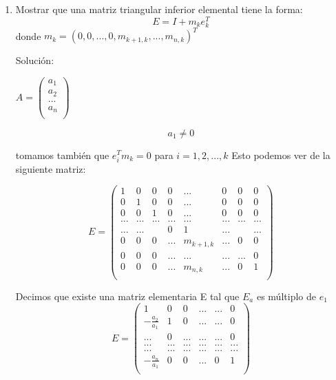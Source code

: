 \begin{enumerate}
    \item Mostrar que una matriz triangular inferior elemental tiene la forma:\\
    
        $$E = I + m_{k}e_{k}^{T}$$
        donde $m_{k}=(0,0,...,0,m_{k+1,k}, ..., m_{n,k})^{T} $
        
        Solución:
        
        \(
            A =
            \left( {\begin{array}{c}
                a_{1} \\
                a_{2} \\
                ... \\
                a_{n}\\
            \end{array} } \right)
        \)
        
        $$a_{1} \neq 0 $$
        
        tomamos también que $e_{i}^{T}m_{k} = 0$ para $i = 1, 2, ..., k$
        Esto podemos ver de la siguiente matriz:
        
        \[
        E =
            \left( {\begin{array}{cccccccc}
                1 & 0  & 0 & 0 & ... & 0 & 0 & 0\\
                0 & 1  & 0 & 0 & ... & 0 & 0 & 0\\
                0 & 0  & 1 & 0 & ... & 0 & 0 & 0\\
                ... & ... & ... & ... & ... & ... & ... & ...\\
                ... & ... &  & 0 & 1 & ... &  & ...\\
                0 & 0  & 0 & ... & m_{k+1,k} & ... & 0 & 0\\
                0 & 0  & 0 & ... & ... & ... & ... & 0\\
                0 & 0  & 0 & ... & m_{n,k} & ... & 0 & 1\\
            \end{array} } \right)
        \]
        
        
        Decimos que existe una matriz elementaria E tal que  $E_{a}$ es múltiplo de $e_{1}$
        \[
        E =
            \left( {\begin{array}{cccccc}
                1 & 0  & 0 & ... & ... & 0\\
                -\frac{a_{2}}{a_{1}} & 1  & 0 & ... & ... & 0\\
                ... & 0 & ... & ... & ... & 0 \\
                ... & ... & ... & ... & ... & ... \\
                ... & ... & ... & ... & ... & ... \\
                -\frac{a_{n}}{a_{1}} & 0 & 0 & ... & 0 & 1 \\
            \end{array} } \right)
        \]
        

\end{enumerate}
